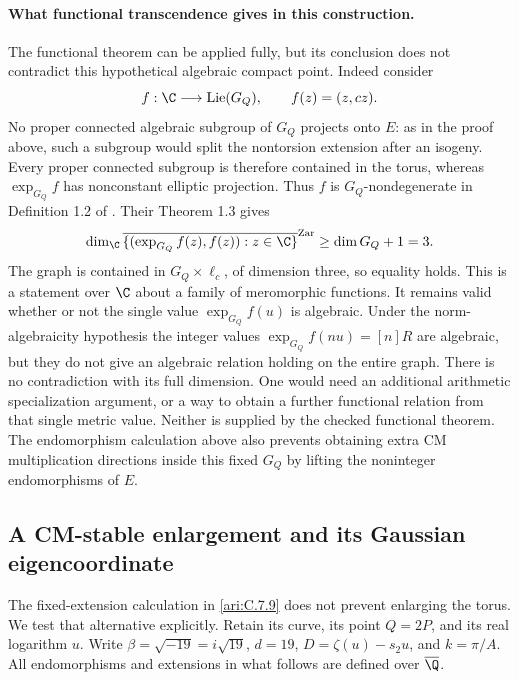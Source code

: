 \paragraph{What functional transcendence gives in this construction.}
The functional theorem can be applied fully, but its conclusion
does not contradict this hypothetical algebraic compact point.
Indeed consider
\[
 f:\C\longrightarrow\operatorname{Lie}(G_Q),\qquad
 f(z)=(z,cz).
\]
No proper connected algebraic subgroup of $G_Q$ projects
onto $E$: as in the proof above, such a subgroup would split
the nontorsion extension after an isogeny. Every proper
connected subgroup is therefore contained in the torus,
whereas $\exp_{G_Q}f$ has nonconstant elliptic projection.
Thus $f$ is $G_Q$-nondegenerate in Definition 1.2 of
\citet{noguchi2024}. Their Theorem 1.3 gives
\[
 \dim_{\C}\overline{\{(\exp_{G_Q}f(z),f(z)):z\in\C\}}^{\rm Zar}
       \ge \dim G_Q+1=3.
\]
The graph is contained in $G_Q\times\ell_c$, of dimension
three, so equality holds. This is a statement over $\C$
about a family of meromorphic functions. It remains valid
whether or not the single value $\exp_{G_Q}f(u)$ is
algebraic. Under the norm-algebraicity hypothesis the integer
values $\exp_{G_Q}f(nu)=[n]R$ are algebraic, but they do
not give an algebraic relation holding on the entire graph.
There is no contradiction with its full dimension.
One would need an additional arithmetic specialization
argument, or a way to obtain a further functional relation
from that single metric value. Neither is supplied by the
checked functional theorem. The endomorphism calculation
above also prevents obtaining extra CM multiplication
directions inside this fixed $G_Q$ by lifting the
noninteger endomorphisms of $E$.


\subsection{A CM-stable enlargement and its Gaussian eigencoordinate}

The fixed-extension calculation in \ref{ari:C.7.9} does not prevent
enlarging the torus. We test that alternative explicitly.
Retain its curve, its point $Q=2P$, and its real logarithm
$u$. Write $\beta=\sqrt{-19}=i\sqrt{19}$, $d=19$,
$D=\zeta(u)-s_2u$, and $k=\pi/A$. All endomorphisms and
extensions in what follows are defined over $\overline\Q$.

